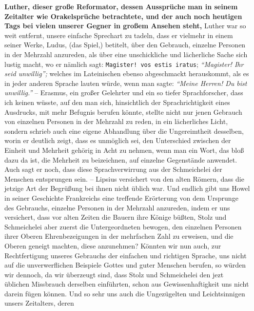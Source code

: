 \textbf{Luther, dieser große Reformator, dessen
Aussprüche man in seinem Zeitalter
wie Orakelsprüche betrachtete, und der auch noch heutigen Tags bei vielen
unserer Gegner in großem Ansehen steht,} Luther
war so weit entfernt, unsere
einfache Sprechart zu tadeln, dass er vielmehr in einem seiner Werke,
Ludus, (das
Spiel,) betitelt, über den Gebrauch, einzelne Personen in der Mehrzahl
anzureden, als über eine unschickliche und lächerliche Sache sich lustig macht,
wo er nämlich sagt: \texttt{Magister! vos estis iratus}; \textit{"`Magister! Ihr
seid
unwillig"';} welches im Lateinischen ebenso abgeschmackt
herauskommt, als es in
jeder anderen Sprache lauten würde, wenn man sagte:
\textit{"`Meine Herren! Du bist unwillig."'} --
Erasmus, ein großer Gelehrter und ein so tiefer
Sprachforscher,
dass ich keinen wüsste, auf den man sich, hinsichtlich der Sprachrichtigkeit eines
Ausdrucks, mit mehr Befugnis berufen könnte, stellte nicht nur jenen Gebrauch
von einzelnen Personen in der Mehrzahl zu reden, in ein lächerliches Licht,
sondern schrieb auch eine eigene Abhandlung über die Ungereimtheit desselben,
worin er deutlich zeigt, dass es unmöglich sei, den Unterschied zwischen der
Einheit und Mehrheit gehörig in Acht zu nehmen, wenn man ein Wort, das bloß dazu
da ist, die Mehrheit zu beizeichnen, auf einzelne Gegenstände anwendet. Auch
sagt er noch, dass diese Sprachverwirrung aus der Schmeichelei der Menschen
entsprungen sein. -- Lipsius versichert von den alten
Römern, dass die jetzige Art
der Begrüßung bei ihnen nicht üblich war. Und endlich gibt uns
Howel in seiner
Geschichte Frankreichs eine treffende Erörterung von dem Ursprunge des
Gebrauchs, einzelne Personen in der Mehrzahl anzureden, indem er uns versichert,
dass vor alten Zeiten die Bauern ihre
Könige büßten, Stolz und Schmeichelei aber
zuerst die Untergeordneten bewogen, den einzelnen Personen ihrer Oberen
Ehrenbezeigungen in der mehrfachen Zahl zu erweisen, und die Oberen geneigt
machten, diese anzunehmen? Könnten wir nun auch, zur Rechtfertigung unseres
Gebrauchs der einfachen und richtigen Sprache, uns nicht auf die unverwerflichen
Beispiele Gottes und guter Menschen berufen, so würden wir dennoch, da wir
überzeugt sind, dass Stolz und Schmeichelei den jezt üblichen Missbrauch derselben
einführten, schon aus Gewissenhaftigkeit uns nicht darein fügen können. Und so
sehr uns auch die Ungezügelten und Leichtsinnigen unsers Zeitalters, deren
